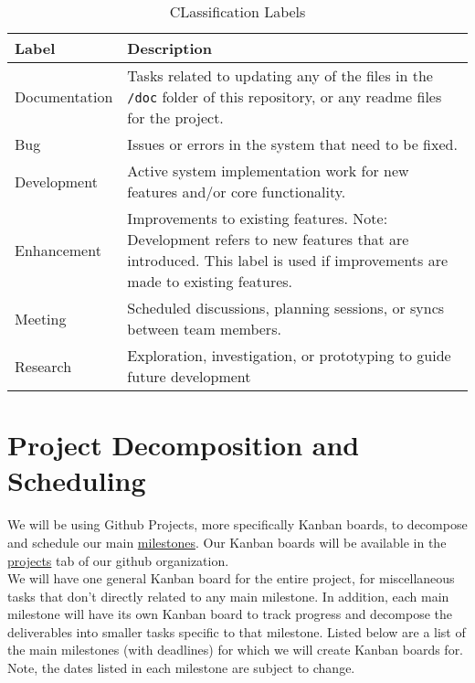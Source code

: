\documentclass{article}
\begin{document}
\begin{table}[h!]
\centering
\begin{tabularx}{\textwidth}{|l|X|}
\hline
\textbf{Label} & \textbf{Description} \\ \hline
Documentation & Tasks related to updating any of the files in the \texttt{/doc} folder of this repository, or any readme files for the project. \\ \hline
Bug & Issues or errors in the system that need to be fixed. \\ \hline
Development & Active system implementation work for new features and/or core functionality. \\ \hline
Enhancement & Improvements to existing features. Note: Development refers to new features that are introduced. This label is used if improvements are made to existing features. \\ \hline
Meeting & Scheduled discussions, planning sessions, or syncs between team members. \\ \hline
Research & Exploration, investigation, or prototyping to guide future development \\ \hline
\end{tabularx}
\caption{CLassification Labels}
\end{table}



\section{Project Decomposition and Scheduling}

We will be using Github Projects, more specifically Kanban boards, to decompose and schedule our main \href{https://github.com/Team6-SixSense/audio360/milestones}{milestones}. 
Our Kanban boards will be available in the \href{https://github.com/orgs/Team6-SixSense/projects}{projects} tab of our github organization. \\

We will have one general Kanban board for the entire project, for miscellaneous tasks that don't directly related to any main milestone. 
In addition, each main milestone will have its own Kanban board to track progress and decompose the deliverables into smaller tasks specific to that milestone. 
Listed below are a list of the main milestones (with deadlines) for which we will create Kanban boards for. 
Note, the dates listed in each milestone are subject to change.
\end{document}
